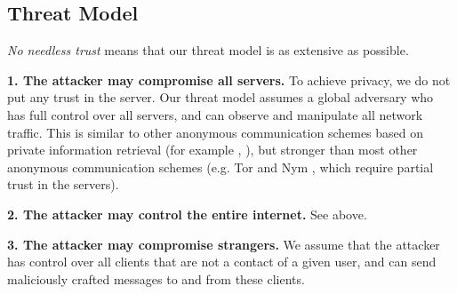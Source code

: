\subsection{Threat Model}
\label{subsec:threatmodel}


\textit{No needless trust} means that our threat model is as extensive as possible.




\textbf{1. The attacker may compromise all servers.} To achieve privacy, we do not put any trust in the server. Our threat model assumes a global adversary who has full control over all servers, and can observe and manipulate all network traffic. This is similar to other anonymous communication schemes based on private information retrieval (for example \cite{ahmad2021addra}, ), but stronger than most other anonymous communication schemes (e.g. Tor \cite{dingledine2004tor} and Nym \cite{piotrowska2017loopix}, which require partial trust in the servers).

\textbf{2. The attacker may control the entire internet.} See above.

\textbf{3. The attacker may compromise strangers.} We assume that the attacker has control over all clients that are not a contact of a given user, and can send maliciously crafted messages to and from these clients.


